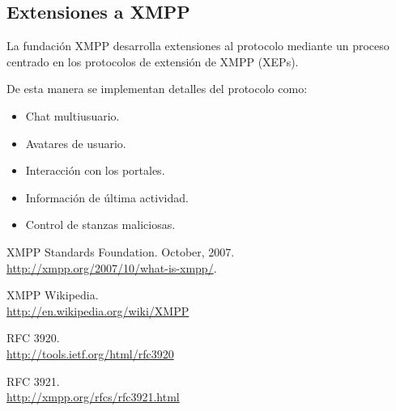 \documentclass[a4paper, 11pt]{article} %
\begin{document}
  \subsection{Extensiones a XMPP}
    La fundación XMPP desarrolla extensiones al protocolo mediante un proceso
    centrado en los protocolos de extensión de XMPP (XEPs).
    
    De esta manera se implementan detalles del protocolo como:
    \begin{itemize}
     \item Chat multiusuario.
     \item Avatares de usuario.
     \item Interacción con los portales.
     \item Información de última actividad.
     \item Control de stanzas maliciosas.
    \end{itemize}

    


  
\vfill
\begin{thebibliography}{9}

  XMPP Standards Foundation. October, 2007.\\
  \url{http://xmpp.org/2007/10/what-is-xmpp/}.
  
  XMPP Wikipedia.\\
  \url{http://en.wikipedia.org/wiki/XMPP}
  
  RFC 3920.\\
  \url{http://tools.ietf.org/html/rfc3920}
  
  RFC 3921.\\
  \url{http://xmpp.org/rfcs/rfc3921.html}
\end{thebibliography}  
  
\end{document}
